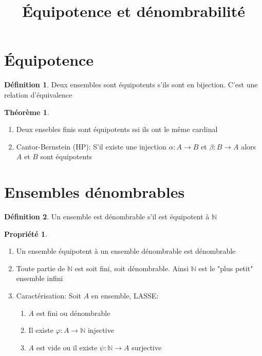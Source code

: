 \documentclass[fleqn]{article}
\title{\'Equipotence et d\'enombrabilit\'e}
\date{}
\theoremstyle{definition} \newtheorem*{defi}{D\'efinition}
\theoremstyle{definition} \newtheorem*{theo}{Th\'eor\`eme}
\theoremstyle{definition} \newtheorem*{coro}{Corollaire}
\theoremstyle{definition} \newtheorem*{nota}{Notation}
\theoremstyle{definition} \newtheorem*{vocab}{Vocabulaire}
\theoremstyle{remark} \newtheorem*{rqs}{Remarques}
\theoremstyle{definition} \newtheorem*{prop}{Propri\'et\'e}
\begin{document}
\maketitle

\section{\'Equipotence}
\begin{defi}
	Deux ensembles sont \'equipotents s'ils sont en bijection. C'est une relation d'\'equivalence
\end{defi}

\begin{theo} $ $
	\begin{enumerate}
		\item Deux ensebles finis sont \'equipotents ssi ils ont le m\^eme cardinal
		\item Cantor-Bernstein (HP): S'il existe une injection $\alpha: A \rightarrow B$ et $\beta: B \rightarrow A$ alors $A$ et $B$ sont
			\'equipotents
	\end{enumerate}
\end{theo}

\section{Ensembles d\'enombrables}
\begin{defi}
	Un ensemble est d\'enombrable s'il est \'equipotent \`a $\mathbb{N}$
\end{defi}

\begin{prop} $ $
	\begin{enumerate}
		\item Un ensemble \'equipotent \`a un ensemble d\'enombrable est d\'enombrable
		\item Toute partie de $\mathbb{N}$ est soit fini, soit d\'enombrable. Ainsi $\mathbb{N}$ est le "plus petit" ensemble infini
		\item Caract\'erisation: Soit $A$ en ensemble, LASSE:
			\begin{enumerate}
				\item $A$ est fini ou d\'enombrable
				\item Il existe $\varphi: A \rightarrow \mathbb{N}$ injective
				\item $A$ est vide ou il existe $\psi: \mathbb{N} \rightarrow A$ surjective
			\end{enumerate}
	\end{enumerate}
\end{prop}
\end{document}
